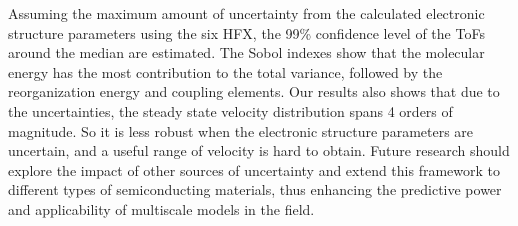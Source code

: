 \documentclass[%
 reprint,
superscriptaddress,
 amsmath,amssymb,
 aps,
prb,
floatfix
]{revtex4-2}
\begin{document}
Assuming the maximum amount of uncertainty from the calculated electronic structure parameters using the six HFX, the 99\% confidence level of the ToFs around the median are estimated. The Sobol indexes show that the molecular energy has the most contribution to the total variance, followed by the reorganization energy and coupling elements. Our results also shows that due to the uncertainties, the steady state velocity distribution spans 4 orders of magnitude. So it is less robust when
the electronic structure parameters are uncertain, and a useful range of velocity is hard to obtain. Future research should explore the impact of other sources of uncertainty and extend this framework to different types of semiconducting materials, thus enhancing the predictive power and applicability of multiscale models in the field.

\end{document}
